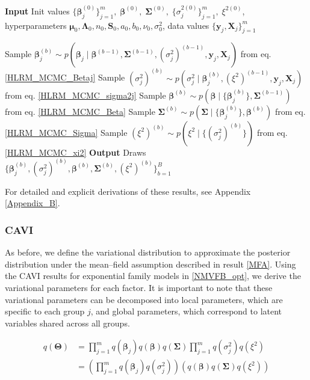 \begin{algorithm}[H]
\caption{Gibbs Sampling for HLRM}
\begin{algorithmic}
\State \textbf{Input} Init values $\{\bm{\beta}_j^{(0)}\}_{j=1}^m,\; \bm{\beta}^{(0)},\; \bm{\Sigma}^{(0)},\; \{\sigma_j^{2(0)}\}_{j=1}^m,\; \xi^{2(0)}$, hyperparameters $\bm{\mu}_0,\bm{\Lambda}_0, n_0,\bm{S}_0,a_0,b_0,\nu_0,\sigma_0^2$, data values $\{\bm{y}_j,\bm{X}_j\}_{j=1}^m$

    \State Sample $\bm{\beta}_j^{(b)} \sim p\!\left(\bm{\beta}_j \mid \bm{\beta}^{(b-1)},\bm{\Sigma}^{(b-1)},(\sigma_j^2)^{(b-1)},\bm{y}_j,\bm{X}_j\right)$ from eq. \ref{HLRM_MCMC_Betaj}
    \State Sample $(\sigma_j^2)^{(b)} \sim p\!\left(\sigma_j^2 \mid \bm{\beta}_j^{(b)},(\xi^2)^{(b-1)},\bm{y}_j,\bm{X}_j\right)$ from eq. \ref{HLRM_MCMC_sigma2j}
  \EndFor
  \State Sample $\bm{\beta}^{(b)} \sim p\!\left(\bm{\beta} \mid \{\bm{\beta}_j^{(b)}\},\bm{\Sigma}^{(b-1)}\right)$ from eq. \ref{HLRM_MCMC_Beta}
  \State Sample $\bm{\Sigma}^{(b)} \sim p\!\left(\bm{\Sigma} \mid \{\bm{\beta}_j^{(b)}\},\bm{\beta}^{(b)}\right)$ from eq. \ref{HLRM_MCMC_Sigma}
  \State Sample $(\xi^2)^{(b)} \sim p\!\left(\xi^2 \mid \{(\sigma_j^2)^{(b)}\}\right)$ from eq. \ref{HLRM_MCMC_xi2}
\EndFor
\State \textbf{Output} Draws $\{\bm{\beta}_j^{(b)},(\sigma_j^2)^{(b)},\bm{\beta}^{(b)},\bm{\Sigma}^{(b)},(\xi^2)^{(b)}\}_{b=1}^B$
\end{algorithmic}
\end{algorithm}

For detailed and explicit derivations of these results, see Appendix \ref{Appendix_B}.

\subsubsection{CAVI}

As before, we define the variational distribution to approximate the posterior distribution under the mean–field assumption described in result \ref{MFA}. Using the CAVI results for exponential family models in \ref{NMVFB_opt}, we derive the variational parameters for each factor. It is important to note that these variational parameters can be decomposed into local parameters, which are specific to each group $j$, and global parameters, which correspond to latent variables shared across all groups.


\begin{equation}
\label{Q_HLRM}
\begin{split}
q(\bm{\Theta})&=\prod_{j=1}^{m}q(\bm{\beta}_j)q(\bm{\beta})q(\bm{\Sigma})\prod_{j=1}^{m}q(\sigma_j^2)q(\xi^2)\\
&= \left(\prod_{j=1}^{m}q(\bm{\beta}_j)q(\sigma_j^2)\right)\left(q(\bm{\beta})q(\bm{\Sigma})q(\xi^2)\right)
\end{split}
\end{equation}

